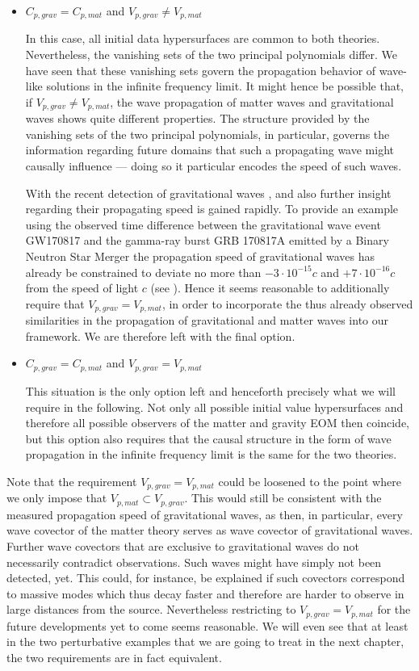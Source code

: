 \begin{itemize}
\item $C_{p,grav} = C_{p,mat}$ and $V_{p,grav} \neq V_{p,mat}$ 

In this case, all initial data hypersurfaces are common to both theories. Nevertheless, the vanishing sets of the two principal polynomials differ. We have seen that these vanishing sets govern the propagation behavior of wave-like solutions in the infinite frequency limit. It might hence be possible that, if $V_{p,grav} \neq V_{p,mat}$, the wave propagation of matter waves and gravitational waves shows quite different properties. The structure provided by the vanishing sets of the two principal polynomials, in particular, governs the information regarding future domains that such a propagating wave might causally influence — doing so it particular encodes the speed of such waves. 

With the recent detection of gravitational waves \cite{2017ApJ...848L..12A}, \cite{2017PhRvL.119n1101A} and \cite{2016PhRvL.116f1102A} also further insight regarding their propagating speed is gained rapidly. 
To provide an example using the observed time difference between the gravitational wave event GW170817 and the gamma-ray burst GRB 170817A emitted by a Binary Neutron Star Merger the propagation speed of gravitational waves has already be constrained to deviate no more than $-3\cdot 10^{{-}15}c$ and $+7\cdot 10^{{-}16}c$ from the speed of light $c$ (see \cite{2017ApJ...848L..13A}). Hence it seems reasonable to additionally require that $V_{p,grav} = V_{p,mat}$, in order to incorporate the thus already observed similarities in the propagation of gravitational and matter waves into our framework. We are therefore left with the final option.
\item $C_{p,grav} = C_{p,mat}$ and $V_{p,grav} = V_{p,mat}$ 

This situation is the only option left and henceforth precisely what we will require in the following. Not only all possible initial value hypersurfaces and therefore all possible observers of the matter and gravity EOM then coincide, but this option also requires that the causal structure in the form of wave propagation in the infinite frequency limit is the same for the two theories.  
\end{itemize}
\begin{remark}
Note that the requirement $V_{p,grav} = V_{p,mat}$ could be loosened to the point where we only impose that $V_{p,mat} \subset V_{p,grav}$. This would still be consistent with the measured propagation speed of gravitational waves, as then, in particular, every wave covector of the matter theory serves as wave covector of gravitational waves. Further wave covectors that are exclusive to gravitational waves do not necessarily contradict observations. Such waves might have simply not been detected, yet. This could, for instance, be explained if such covectors correspond to massive modes which thus decay faster and therefore are harder to observe in large distances from the source. Nevertheless restricting to $V_{p,grav} = V_{p,mat}$ for the future developments yet to come seems reasonable.
We will even see that at least in the two perturbative examples that we are going to treat in the next chapter, the two requirements are in fact equivalent.
\end{remark}
